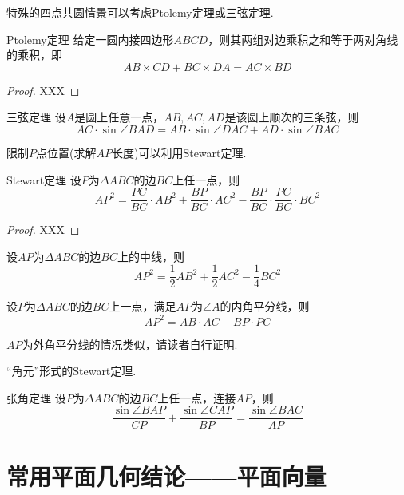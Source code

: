 \documentclass[lang=cn, zihao=4.5]{elegantbook}
\begin{document}
特殊的四点共圆情景可以考虑Ptolemy定理或三弦定理.

\begin{theorem}{Ptolemy定理}
    给定一圆内接四边形$ABCD$，则其两组对边乘积之和等于两对角线的乘积，即$$AB \times CD + BC \times DA = AC \times BD$$
\end{theorem}
\begin{proof}
    XXX
\end{proof}

\begin{corollary}{三弦定理}
    设$A$是圆上任意一点，$AB,AC,AD$是该圆上顺次的三条弦，则$$AC \cdot \sin \angle BAD = AB \cdot \sin \angle DAC + AD \cdot \sin \angle BAC$$
\end{corollary}

限制$P$点位置(求解$AP$长度)可以利用Stewart定理.

\begin{theorem}{Stewart定理}
    设$P$为$\Delta ABC$的边$BC$上任一点，则$$AP^2=\frac{PC}{BC} \cdot AB^2 + \frac{BP}{BC} \cdot AC^2 - \frac{BP}{BC} \cdot \frac{PC}{BC} \cdot BC^2$$
\end{theorem}
\begin{proof}
    XXX
\end{proof}

\begin{corollary}
    设$AP$为$\Delta ABC$的边$BC$上的中线，则$$AP^2 = \frac{1}{2} AB^2 + \frac{1}{2} AC^2 - \frac{1}{4}BC^2$$
\end{corollary}
    
\begin{corollary}
    设$P$为$\Delta ABC$的边$BC$上一点，满足$AP$为$\angle A$的内角平分线，则$$AP^2 = AB \cdot AC - BP \cdot PC$$
\end{corollary}
\begin{remark}
    $AP$为外角平分线的情况类似，请读者自行证明.
\end{remark}

“角元”形式的Stewart定理.

\begin{theorem}{张角定理}
    设$P$为$\Delta ABC$的边$BC$上任一点，连接$AP$，则$$\frac{\sin \angle BAP}{CP} + \frac{\sin \angle CAP}{BP} = \frac{\sin \angle BAC}{AP}$$
\end{theorem}

\section{常用平面几何结论——平面向量}
\end{document}
